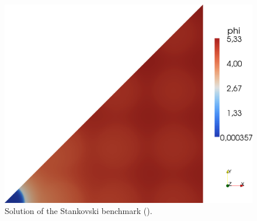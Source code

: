 \begin{figure}[!ht]
\centering
  \includegraphics[scale=.17]{stankov/SP1.png}
  \caption[Solution of the Stankovski benchmark ($\text{SP}_1$)]{Solution of the Stankovski benchmark
   (\SPN[1]).}
  \label{fig:32}
\end{figure}
